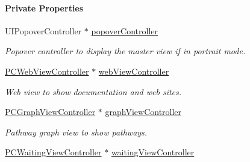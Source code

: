 \begin{Indent}\paragraph*{Private Properties}
\begin{DoxyCompactItemize}
\item 
\hypertarget{interface_p_c_detail_view_controller_a90aed002ae5c4854c1620d6661e4faaf}{
UIPopoverController $\ast$ \hyperlink{interface_p_c_detail_view_controller_a90aed002ae5c4854c1620d6661e4faaf}{popoverController}}
\label{interface_p_c_detail_view_controller_a90aed002ae5c4854c1620d6661e4faaf}

\begin{DoxyCompactList}\small\item\em Popover controller to display the master view if in portrait mode. \end{DoxyCompactList}\item 
\hypertarget{interface_p_c_detail_view_controller_ad69f4b49436866489d4e48ccc19edc9a}{
\hyperlink{interface_p_c_web_view_controller}{PCWebViewController} $\ast$ \hyperlink{interface_p_c_detail_view_controller_ad69f4b49436866489d4e48ccc19edc9a}{webViewController}}
\label{interface_p_c_detail_view_controller_ad69f4b49436866489d4e48ccc19edc9a}

\begin{DoxyCompactList}\small\item\em Web view to show documentation and web sites. \end{DoxyCompactList}\item 
\hypertarget{interface_p_c_detail_view_controller_a28bceae38b69ad407f1e9326d60cf3ed}{
\hyperlink{interface_p_c_graph_view_controller}{PCGraphViewController} $\ast$ \hyperlink{interface_p_c_detail_view_controller_a28bceae38b69ad407f1e9326d60cf3ed}{graphViewController}}
\label{interface_p_c_detail_view_controller_a28bceae38b69ad407f1e9326d60cf3ed}

\begin{DoxyCompactList}\small\item\em Pathway graph view to show pathways. \end{DoxyCompactList}\item 
\hypertarget{interface_p_c_detail_view_controller_a02d89cef625e06ee6a2bdb35a76196b6}{
\hyperlink{interface_p_c_waiting_view_controller}{PCWaitingViewController} $\ast$ \hyperlink{interface_p_c_detail_view_controller_a02d89cef625e06ee6a2bdb35a76196b6}{waitingViewController}}
\label{interface_p_c_detail_view_controller_a02d89cef625e06ee6a2bdb35a76196b6}


\end{DoxyCompactItemize}
\end{Indent}
